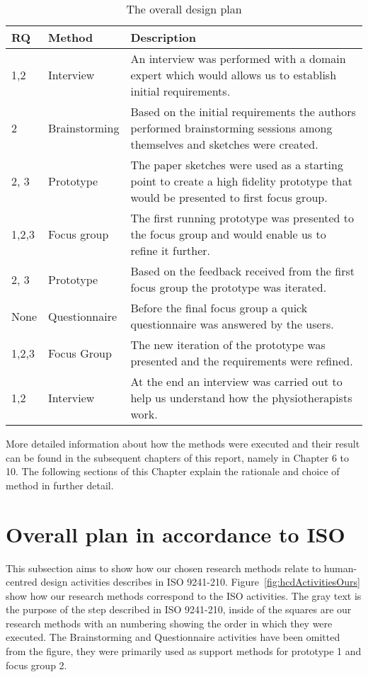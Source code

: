 \begin{table}[h!]
  \centering
  \begin{tabular}{|p{0.7cm}|p{2cm}|p{9cm}|}
    \hline
    \textbf{RQ} & \textbf{Method} & \textbf{Description} \\ \hline
    1,2 & Interview & An interview was performed with a domain expert which would allows us to establish initial requirements. \\ \hline
    2 & Brainstorming & Based on the initial requirements the authors performed brainstorming sessions among themselves and sketches were created. \\ \hline
    2, 3 & Prototype & The paper sketches were used as a starting point to create a high fidelity prototype that would be presented to first focus group. \\ \hline
    1,2,3 & Focus group & The first running prototype was presented to the focus group and would enable us to refine it further. \\ \hline
    2, 3 & Prototype & Based on the feedback received from the first focus group the prototype was iterated. \\ \hline
    None & Questionnaire & Before the final focus group a quick questionnaire was answered by the users. \\ \hline
    1,2,3 & Focus Group & The new iteration of the prototype was presented and the requirements were refined. \\ \hline
    1,2 & Interview & At the end an interview was carried out to help us understand how the physiotherapists work. \\ \hline
  \end{tabular}
  \caption{The overall design plan}
  \label{tab:designPlan}
\end{table}

More detailed information about how the methods were executed and their result can be found in the subsequent chapters of this report, namely in Chapter 6 to 10. The following sections of this Chapter explain the rationale and choice of method in further detail.
 
\section{Overall plan in accordance to ISO}
This subsection aims to show how our chosen research methods relate to human-centred design activities describes in ISO 9241-210. Figure~\ref{fig:hcdActivitiesOurs} show how our research methods correspond to the ISO activities. The gray text is the purpose of the step described in ISO 9241-210, inside of the squares are our research methods with an numbering showing the order in which they were executed. The Brainstorming and Questionnaire activities have been omitted from the figure, they were primarily used as support methods for prototype 1 and focus group 2.

